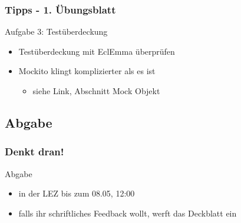 \documentclass[18pt]{beamer}
\begin{document}
	\begin{frame}
		\frametitle{Tipps - 1. Übungsblatt}
		\begin{exampleblock}{Aufgabe 3: Testüberdeckung}
		\begin{itemize}
			\item Testüberdeckung mit EclEmma überprüfen
			\item Mockito klingt komplizierter als es ist 
			\begin{itemize}
				\item siehe Link, Abschnitt Mock Objekt
			\end{itemize}
		\end{itemize}
	\end{exampleblock}
\end{frame}
	
	\subsection{Abgabe}
	\begin{frame}
		\frametitle{Denkt dran!}
		\begin{alertblock}{Abgabe}
			\begin{itemize}
				\item in der LEZ bis zum 08.05, 12:00
				\item falls ihr schriftliches Feedback wollt, werft das Deckblatt ein
			\end{itemize}
		\end{alertblock}
	\end{frame}
		
\end{document}
